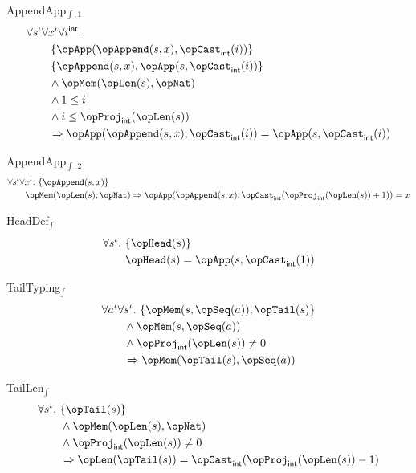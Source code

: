 \documentclass[11pt, a4paper, oneside]{article}
\begin{document}
\begin{axioms}
\item[AppendApp$_{\int,1}$] \[
        \begin{aligned}
            &\forall s^\idv \forall x^\idv \forall i^\int. \\
            &\qquad \st{ \opApp(\opAppend(s, x), \opCast_\int(i)) } \\
            &\qquad \st{ \opAppend(s, x), \opApp(s, \opCast_\int(i)) } \\
            &\qquad \wedge \opMem(\opLen(s), \opNat) \\
            &\qquad \wedge 1 \le i \\
            &\qquad \wedge i \le \opProj_\int(\opLen(s)) \\
            &\qquad \imp \opApp(\opAppend(s, x), \opCast_\int(i)) = \opApp(s, \opCast_\int(i))
        \end{aligned}
    \]

\item[AppendApp$_{\int,2}$] \[
        \begin{aligned}
            &\forall s^\idv \forall x^\idv.\, \st{ \opAppend(s, x) } \\
            &\qquad \opMem(\opLen(s), \opNat) \imp \opApp(\opAppend(s, x), \opCast_\int(\opProj_\int(\opLen(s)) + 1)) = x
        \end{aligned}
    \]

\item[HeadDef$_\int$] \[
        \begin{aligned}
            &\forall s^\idv.\, \st{ \opHead(s) } \\
            &\qquad \opHead(s) = \opApp(s, \opCast_\int(1))
        \end{aligned}
    \]

\item[TailTyping$_\int$] \[
        \begin{aligned}
            &\forall a^\idv \forall s^\idv.\, \st{ \opMem(s, \opSeq(a)), \opTail(s) } \\
            &\qquad \wedge \opMem(s, \opSeq(a)) \\
            &\qquad \wedge \opProj_\int(\opLen(s)) \neq 0 \\
            &\qquad \imp \opMem(\opTail(s), \opSeq(a))
        \end{aligned}
    \]

\item[TailLen$_\int$] \[
        \begin{aligned}
            &\forall s^\idv.\, \st{ \opTail(s) } \\
            &\qquad \wedge \opMem(\opLen(s), \opNat) \\
            &\qquad \wedge \opProj_\int(\opLen(s)) \neq 0 \\
            &\qquad \imp \opLen(\opTail(s)) = \opCast_\int(\opProj_\int(\opLen(s)) - 1)
        \end{aligned}
    \]


\end{axioms}
\end{document}
